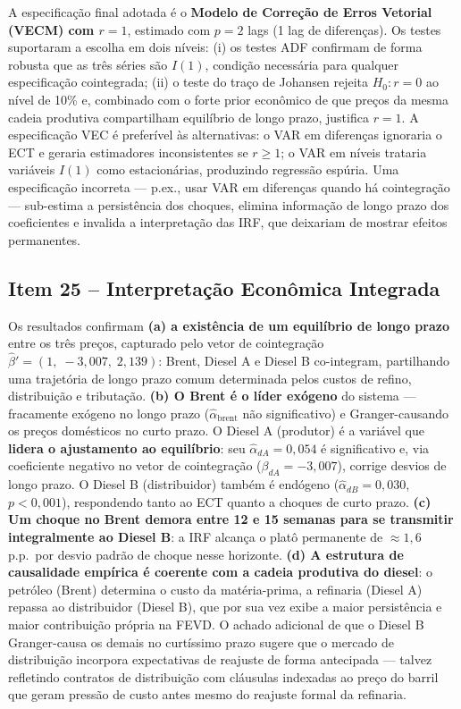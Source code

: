 \documentclass[12pt,a4paper]{article}
\begin{document}
A especificação final adotada é o \textbf{Modelo de Correção de Erros Vetorial
(VECM) com $r = 1$}, estimado com $p = 2$ lags (1 lag de diferenças).
Os testes suportaram a escolha em dois níveis: (i) os testes ADF confirmam
de forma robusta que as três séries são $I(1)$, condição necessária para
qualquer especificação cointegrada; (ii) o teste do traço de Johansen rejeita
$H_0: r = 0$ ao nível de 10\% e, combinado com o forte prior econômico de
que preços da mesma cadeia produtiva compartilham equilíbrio de longo prazo,
justifica $r = 1$.
A especificação VEC é preferível às alternativas: o VAR em diferenças
ignoraria o ECT e geraria estimadores inconsistentes se $r \ge 1$; o VAR
em níveis trataria variáveis $I(1)$ como estacionárias, produzindo
regressão espúria.
Uma especificação incorreta --- p.ex., usar VAR em diferenças quando há
cointegração --- sub-estima a persistência dos choques, elimina informação
de longo prazo dos coeficientes e invalida a interpretação das IRF,
que deixariam de mostrar efeitos permanentes.

\subsection{Item 25 -- Interpretação Econômica Integrada}

Os resultados confirmam \textbf{(a) a existência de um equilíbrio de longo
prazo} entre os três preços, capturado pelo vetor de cointegração
$\hat{\beta}' = (1,\; -3{,}007,\; 2{,}139)$: Brent, Diesel A e Diesel B
co-integram, partilhando uma trajetória de longo prazo comum determinada
pelos custos de refino, distribuição e tributação.
\textbf{(b) O Brent é o líder exógeno} do sistema --- fracamente exógeno
no longo prazo ($\hat{\alpha}_{\text{brent}}$ não significativo) e Granger-causando
os preços domésticos no curto prazo.
O Diesel A (produtor) é a variável que \textbf{lidera o ajustamento ao
equilíbrio}: seu $\hat{\alpha}_{dA} = 0{,}054$ é significativo e,
via coeficiente negativo no vetor de cointegração ($\beta_{dA} = -3{,}007$),
corrige desvios de longo prazo.
O Diesel B (distribuidor) também é endógeno ($\hat{\alpha}_{dB} = 0{,}030$,
$p < 0{,}001$), respondendo tanto ao ECT quanto a choques de curto prazo.
\textbf{(c) Um choque no Brent demora entre 12 e 15 semanas para se
transmitir integralmente ao Diesel B}: a IRF alcança o platô permanente
de $\approx 1{,}6$ p.p.\ por desvio padrão de choque nesse horizonte.
\textbf{(d) A estrutura de causalidade empírica é coerente com a cadeia
produtiva do diesel}: o petróleo (Brent) determina o custo da matéria-prima,
a refinaria (Diesel A) repassa ao distribuidor (Diesel B), que por sua vez
exibe a maior persistência e maior contribuição própria na FEVD.
O achado adicional de que o Diesel B Granger-causa os demais
no curtíssimo prazo sugere que o mercado de distribuição incorpora
expectativas de reajuste de forma antecipada --- talvez refletindo
contratos de distribuição com cláusulas indexadas ao preço do barril
que geram pressão de custo antes mesmo do reajuste formal da refinaria.
\end{document}

